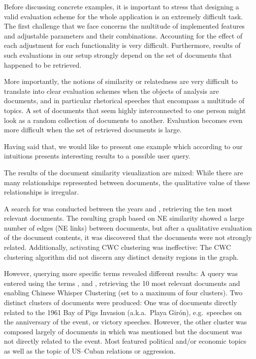 Before discussing concrete examples, it is important to stress that designing a valid evaluation scheme for the whole application is an extremely difficult task. The first challenge that we face concerns the multitude of implemented features and adjustable parameters and their combinations. Accounting for the effect of each adjustment for each functionality is very difficult. Furthermore, results of such evaluations in our setup strongly depend on the set of documents that happened to be retrieved.   

More importantly, the notions of similarity or relatedness are very difficult to translate into clear evaluation schemes when the objects of analysis are documents, and in particular rhetorical speeches that encompass a multitude of topics. A set of documents that seem highly interconnected to one person might look as a random collection of documents to another. Evaluation becomes even more difficult when the set of retrieved documents is large. 

Having said that, we would like to present one example which according to our intuitions presents interesting results to a possible user query.


The results of the document similarity visualization are mixed: While there are many relationships represented between documents, the qualitative value of these relationships is irregular.

A search for  was conducted between the years  and , retrieving the ten most relevant documents. The resulting graph based on NE similarity showed a large number of 
edges (NE links) between documents, but after a qualitative evaluation of the document contents, it was discovered that the documents were not strongly related. Additionally, activating CWC clustering was ineffective: The CWC clustering algorithm did not discern any distinct density regions in the graph.

However, querying more specific terms revealed different results: A query was entered using the terms , and , retrieving the 10 most relevant documents and enabling Chinese Whisper Clustering (set to a maximum of four clusters). Two distinct clusters of documents were produced: One was of documents directly related to the 1961 Bay of Pigs Invasion (a.k.a.\ Playa Gir\'{o}n), e.g.\ speeches on the anniversary of the event, or victory speeches. However, the other cluster was composed largely of documents in which  was mentioned but the document was not directly related to the event. Most featured political and/or economic topics as well as the topic of US--Cuban relations or aggression.

